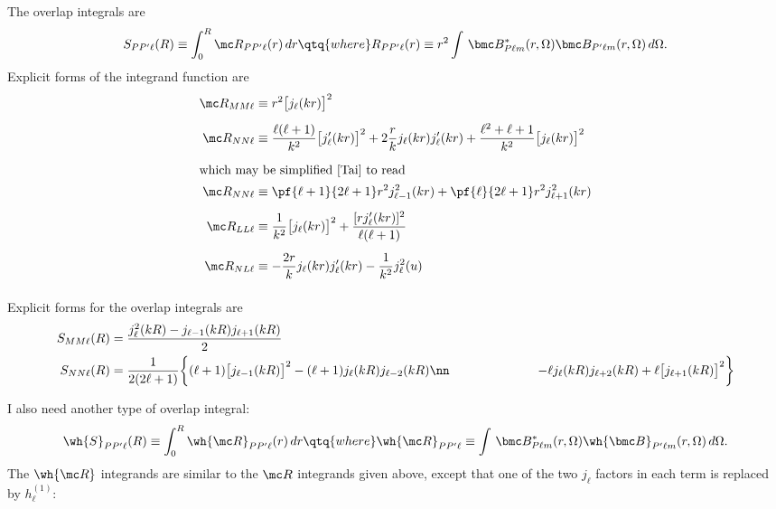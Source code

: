 \documentclass[letterpaper]{article}
\begin{document}
The overlap integrals are
$$
 S_{PP^\prime \ell}(R) \equiv \int_0^R \mc R_{PP^\prime \ell}(r)\, dr
\qtq{where}
R_{PP^\prime\ell}(r)\equiv r^2 \int\,
 \bmc B^*_{P\ell m}(r,\Omega)
 \bmc B_{P^\prime\ell m}(r,\Omega)\,d\Omega.
$$
Explicit forms of the integrand function are
\begin{align*}
\mc R_{MM\ell}&\equiv r^2 \big[j_\ell(kr)\big]^2 
\\[5pt]
\mc R_{NN\ell}&\equiv
  \frac{\ell(\ell+1)}{k^2} \big[j^\prime_\ell(kr)\big]^2 
 +2\frac{r}{k}j_\ell(kr) j_\ell^\prime(kr)
 +\frac{\ell^2+\ell+1}{k^2}\big[j_\ell(kr)\big]^2
\\[5pt]
\intertext{which may be simplified~\cite{Tai} to read}
\mc R_{NN\ell}&\equiv \pf{\ell+1}{2\ell+1}r^2 j_{\ell-1}^2(kr) 
                    + \pf{\ell}{2\ell+1}r^2 j_{\ell+1}^2(kr)
\\[5pt]
\mc R_{LL\ell}&\equiv 
  \frac{1}{k^2} \big[j_\ell(kr)\big]^2 
  + \frac{[rj_\ell^\prime(kr)]^2}{\ell(\ell+1)}
\\[5pt]
\mc R_{NL\ell}&\equiv 
  -\frac{2r}{k}j_\ell(kr)j^\prime_\ell(kr) - \frac{1}{k^2}j^2_\ell(u)
\\[5pt]
\end{align*}

Explicit forms for the overlap integrals are
\begin{subequations}
\begin{align}
 S_{MM\ell}(R)
&=\frac{j_\ell^2(kR) - j_{\ell-1}(kR) j_{\ell+1}(kR)}{2}
\\
 S_{NN\ell}(R)
&=\frac{1}{2(2\ell+1)}
  \bigg\{    (\ell+1)\big[j_{\ell-1}(kR)\big]^2 
           - (\ell+1)j_{\ell}(kR) j_{\ell-2}(kR)
\nn
&\qquad\qquad\qquad
           - \ell j_{\ell}(kR) j_{\ell+2}(kR)
           + \ell\big[j_{\ell+1}(kR)\big]^2
  \bigg\}
\end{align}
\label{ExplicitOverlapIntegrals}
\end{subequations}

I also need another type of overlap integral:
$$
 \wh{S}_{PP^\prime \ell}(R) \equiv 
 \int_0^R \wh{\mc R}_{PP^\prime \ell}(r)\, dr
\qtq{where}
\wh{\mc R}_{PP^\prime\ell}\equiv \int\,
 \bmc B^*_{P\ell m}(r,\Omega)
 \wh{\bmc B}_{P^\prime\ell m}(r,\Omega)\,d\Omega.
$$
The $\wh{\mc R}$ integrands are similar to the $\mc R$ integrands
given above, except that one of the two $j_\ell$ factors in each 
term is replaced by $h_\ell^{(1)}$:
\end{document}
